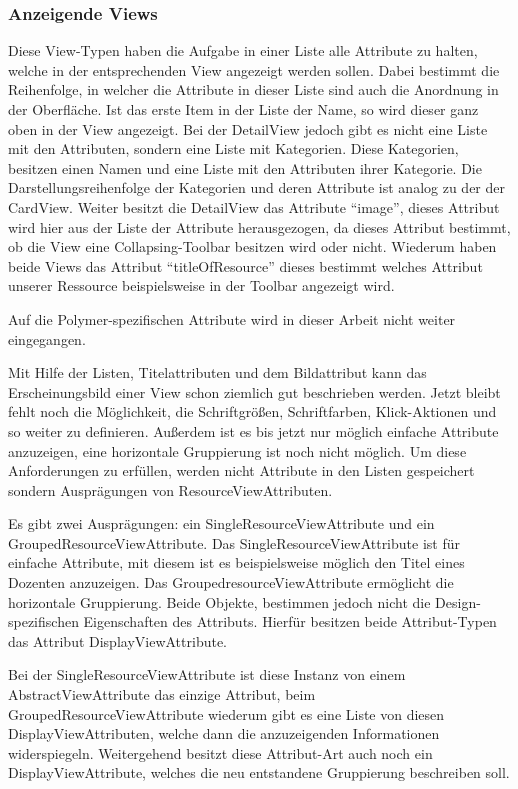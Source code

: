 \subsubsection{Anzeigende Views}
Diese View-Typen haben die Aufgabe in einer Liste alle Attribute zu halten, welche in der entsprechenden View angezeigt werden sollen. Dabei bestimmt die Reihenfolge, in welcher die Attribute in dieser Liste sind auch die Anordnung in der Oberfläche. Ist das erste Item in der Liste der Name, so wird dieser ganz oben in der View angezeigt.
Bei der DetailView jedoch gibt es nicht eine Liste mit den Attributen, sondern eine Liste mit Kategorien. Diese Kategorien, besitzen 
einen Namen und eine Liste mit den Attributen ihrer Kategorie. Die Darstellungsreihenfolge der Kategorien und deren Attribute ist analog zu der der CardView. Weiter besitzt die DetailView das Attribute \enquote{image}, dieses Attribut wird hier aus der Liste der Attribute herausgezogen, da dieses Attribut bestimmt, ob die View eine Collapsing-Toolbar besitzen wird oder nicht. Wiederum haben beide Views das Attribut \enquote{titleOfResource} dieses bestimmt welches Attribut unserer Ressource beispielsweise in der Toolbar angezeigt wird.

Auf die Polymer-spezifischen Attribute wird in dieser Arbeit nicht weiter eingegangen.

Mit Hilfe der Listen, Titelattributen und dem Bildattribut kann das Erscheinungsbild einer View schon ziemlich gut beschrieben werden. Jetzt bleibt fehlt noch die Möglichkeit, die Schriftgrößen, Schriftfarben, Klick-Aktionen und so weiter zu definieren.
Außerdem ist es bis jetzt nur möglich einfache Attribute anzuzeigen, eine horizontale Gruppierung ist noch nicht möglich. Um diese Anforderungen zu erfüllen, werden nicht Attribute in den Listen gespeichert sondern Ausprägungen von ResourceViewAttributen. 

Es gibt zwei Ausprägungen: ein SingleResourceViewAttribute und ein GroupedResourceViewAttribute.  Das SingleResourceViewAttribute ist für einfache Attribute, mit diesem ist es beispielsweise möglich den Titel eines Dozenten anzuzeigen. Das GroupedresourceViewAttribute ermöglicht die horizontale Gruppierung. Beide Objekte, bestimmen jedoch nicht die Design-spezifischen Eigenschaften des Attributs. Hierfür besitzen beide Attribut-Typen das Attribut DisplayViewAttribute.

Bei der SingleResourceViewAttribute ist diese Instanz von einem AbstractViewAttribute das einzige Attribut, beim GroupedResourceViewAttribute wiederum gibt es eine Liste von diesen DisplayViewAttributen, welche dann die anzuzeigenden Informationen widerspiegeln. Weitergehend besitzt diese Attribut-Art auch noch ein DisplayViewAttribute, welches die neu entstandene Gruppierung beschreiben soll.

